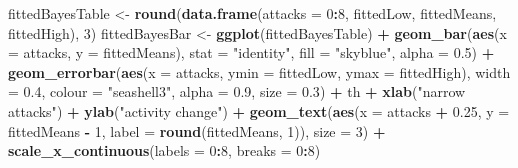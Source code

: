 \documentclass[10pt,]{scrartcl}
\newenvironment{Shaded}{\begin{snugshade}}{\end{snugshade}}
\newcommand{\KeywordTok}[1]{\textcolor[rgb]{0.13,0.29,0.53}{\textbf{#1}}}
\newcommand{\DataTypeTok}[1]{\textcolor[rgb]{0.13,0.29,0.53}{#1}}
\newcommand{\DecValTok}[1]{\textcolor[rgb]{0.00,0.00,0.81}{#1}}
\newcommand{\FloatTok}[1]{\textcolor[rgb]{0.00,0.00,0.81}{#1}}
\newcommand{\StringTok}[1]{\textcolor[rgb]{0.31,0.60,0.02}{#1}}
\newcommand{\OperatorTok}[1]{\textcolor[rgb]{0.81,0.36,0.00}{\textbf{#1}}}
\newcommand{\NormalTok}[1]{#1}
\begin{document}
\begin{Shaded}
\begin{Highlighting}[]
\NormalTok{fittedBayesTable <-}\StringTok{ }\KeywordTok{round}\NormalTok{(}\KeywordTok{data.frame}\NormalTok{(}\DataTypeTok{attacks =} \DecValTok{0}\OperatorTok{:}\DecValTok{8}\NormalTok{, fittedLow,}
\NormalTok{    fittedMeans, fittedHigh), }\DecValTok{3}\NormalTok{)}
\NormalTok{fittedBayesBar <-}\StringTok{ }\KeywordTok{ggplot}\NormalTok{(fittedBayesTable) }\OperatorTok{+}\StringTok{ }\KeywordTok{geom_bar}\NormalTok{(}\KeywordTok{aes}\NormalTok{(}\DataTypeTok{x =}\NormalTok{ attacks,}
    \DataTypeTok{y =}\NormalTok{ fittedMeans), }\DataTypeTok{stat =} \StringTok{"identity"}\NormalTok{, }\DataTypeTok{fill =} \StringTok{"skyblue"}\NormalTok{, }\DataTypeTok{alpha =} \FloatTok{0.5}\NormalTok{) }\OperatorTok{+}
\StringTok{    }\KeywordTok{geom_errorbar}\NormalTok{(}\KeywordTok{aes}\NormalTok{(}\DataTypeTok{x =}\NormalTok{ attacks, }\DataTypeTok{ymin =}\NormalTok{ fittedLow, }\DataTypeTok{ymax =}\NormalTok{ fittedHigh),}
        \DataTypeTok{width =} \FloatTok{0.4}\NormalTok{, }\DataTypeTok{colour =} \StringTok{"seashell3"}\NormalTok{, }\DataTypeTok{alpha =} \FloatTok{0.9}\NormalTok{, }\DataTypeTok{size =} \FloatTok{0.3}\NormalTok{) }\OperatorTok{+}
\StringTok{    }\NormalTok{th }\OperatorTok{+}\StringTok{ }\KeywordTok{xlab}\NormalTok{(}\StringTok{"narrow attacks"}\NormalTok{) }\OperatorTok{+}\StringTok{ }\KeywordTok{ylab}\NormalTok{(}\StringTok{"activity change"}\NormalTok{) }\OperatorTok{+}\StringTok{ }\KeywordTok{geom_text}\NormalTok{(}\KeywordTok{aes}\NormalTok{(}\DataTypeTok{x =}\NormalTok{ attacks }\OperatorTok{+}
\StringTok{    }\FloatTok{0.25}\NormalTok{, }\DataTypeTok{y =}\NormalTok{ fittedMeans }\OperatorTok{-}\StringTok{ }\DecValTok{1}\NormalTok{, }\DataTypeTok{label =} \KeywordTok{round}\NormalTok{(fittedMeans, }\DecValTok{1}\NormalTok{)),}
    \DataTypeTok{size =} \DecValTok{3}\NormalTok{) }\OperatorTok{+}\StringTok{ }\KeywordTok{scale_x_continuous}\NormalTok{(}\DataTypeTok{labels =} \DecValTok{0}\OperatorTok{:}\DecValTok{8}\NormalTok{, }\DataTypeTok{breaks =} \DecValTok{0}\OperatorTok{:}\DecValTok{8}\NormalTok{)}



\end{Highlighting}
\end{Shaded}
\end{document}
